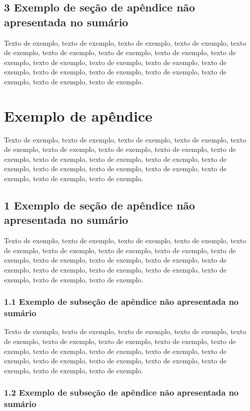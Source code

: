 \documentclass[
	12pt,				%
	oneside,			%
	a4paper,			%
	english,			%
	brazil				%
	]{abntex2ppgsi}
\begin{document}
\begin{apendicesenv}
\section*{3 Exemplo de seção de apêndice não apresentada no sumário}

Texto de exemplo, texto de exemplo, texto de exemplo, texto de exemplo, texto de exemplo, texto de exemplo, texto de exemplo, texto de exemplo, texto de exemplo, texto de exemplo, texto de exemplo, texto de exemplo, texto de exemplo, texto de exemplo, texto de exemplo, texto de exemplo, texto de exemplo, texto de exemplo, texto de exemplo.


\chapter{Exemplo de apêndice}

Texto de exemplo, texto de exemplo, texto de exemplo, texto de exemplo, texto de exemplo, texto de exemplo, texto de exemplo, texto de exemplo, texto de exemplo, texto de exemplo, texto de exemplo, texto de exemplo, texto de exemplo, texto de exemplo, texto de exemplo, texto de exemplo, texto de exemplo, texto de exemplo, texto de exemplo.

\section*{1 Exemplo de seção de apêndice não apresentada no sumário}

Texto de exemplo, texto de exemplo, texto de exemplo, texto de exemplo, texto de exemplo, texto de exemplo, texto de exemplo, texto de exemplo, texto de exemplo, texto de exemplo, texto de exemplo, texto de exemplo, texto de exemplo, texto de exemplo, texto de exemplo, texto de exemplo, texto de exemplo, texto de exemplo, texto de exemplo.

\subsection*{1.1 Exemplo de subseção de apêndice não apresentada no sumário}

Texto de exemplo, texto de exemplo, texto de exemplo, texto de exemplo, texto de exemplo, texto de exemplo, texto de exemplo, texto de exemplo, texto de exemplo, texto de exemplo, texto de exemplo, texto de exemplo, texto de exemplo, texto de exemplo, texto de exemplo, texto de exemplo, texto de exemplo, texto de exemplo, texto de exemplo.

\subsection*{1.2 Exemplo de subseção de apêndice não apresentada no sumário}


\end{apendicesenv}
\end{document}
